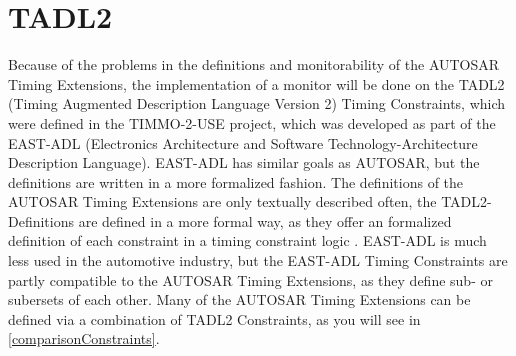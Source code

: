 \section{TADL2}
	Because of the problems in the definitions and monitorability of the AUTOSAR Timing Extensions, the implementation of a monitor will be done on the TADL2 (Timing Augmented Description Language Version 2) Timing Constraints, which were defined in the TIMMO-2-USE project, which was developed as part of the EAST-ADL (Electronics Architecture and Software Technology-Architecture Description Language). EAST-ADL has similar goals as AUTOSAR, but the definitions are written in a more formalized fashion. The definitions of the AUTOSAR Timing Extensions are only textually described often, the TADL2-Definitions are defined in a more formal way, as they offer an formalized definition of each constraint in a timing constraint logic \cite{TIMMO2USE}. EAST-ADL is much less used in the automotive industry, but the EAST-ADL Timing Constraints are partly compatible to the AUTOSAR Timing Extensions, as they define sub- or subersets of each other. Many of the AUTOSAR Timing Extensions can be defined via a combination of TADL2 Constraints, as you will see in \ref{comparisonConstraints}.
	

